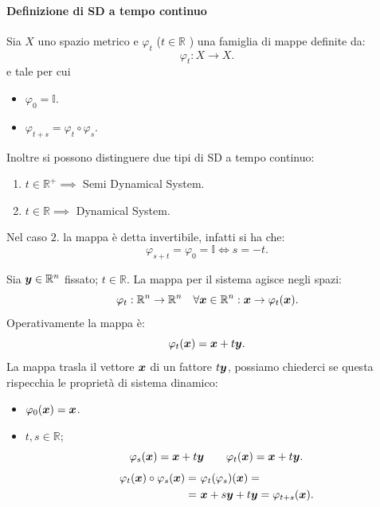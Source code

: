 \paragraph{Definizione di SD a tempo continuo}%
\label{par:Definizione di SD a tempo continuo}
\begin{defn}
    Sia $X$ uno spazio metrico e $\varphi_t$ ($t \in \mathbb{R}$ ) una famiglia di mappe definite da:
    \[
	\varphi_t: X\to X
    .\] 
    e tale per cui
    \begin{itemize}
	\item $\varphi_0 = \mathbb{I}$.
	\item $\varphi_{t+s}=\varphi_t \circ \varphi_s$.
    \end{itemize}
    Inoltre si possono distinguere due tipi di SD a tempo continuo:
    \begin{enumerate}
        \item $t\in \mathbb{R}^+ \implies$ Semi Dynamical System.
        \item $t\in \mathbb{R} \implies$ Dynamical System.
    \end{enumerate}
    Nel caso $2.$ la mappa è detta invertibile, infatti si ha che:
    \[
        \varphi_{s+t} = \varphi_0 = \mathbb{I} \iff s = -t
    .\] 
\end{defn}
\noindent
\begin{exmp}[Traslazione]
    Sia $\boldsymbol{y}\in \mathbb{R}^n$ fissato; $t\in \mathbb{R}$. La mappa per il sistema agisce negli spazi:
    \[
	\varphi_t: \mathbb{R}^n \to \mathbb{R}^n \quad \forall \boldsymbol{x} \in \mathbb{R}^n: \boldsymbol{x}  \to \varphi_t(\boldsymbol{x})
    .\] 
    Operativamente la mappa è:
    \[
	\varphi_t(\boldsymbol{x}) = \boldsymbol{x} + t\boldsymbol{y}
    .\] 
    La mappa trasla il vettore $\boldsymbol{x}$ di un fattore $t\boldsymbol{y}$, possiamo chiederci se questa rispecchia le proprietà di sistema dinamico:
    \begin{itemize}
	\item $\varphi_0(\boldsymbol{x})= \boldsymbol{x}$.
	\item $t, s \in \mathbb{R}$; 
	    \[
		\varphi_s(\boldsymbol{x}) = \boldsymbol{x}  + t\boldsymbol{y}  \qquad \varphi_t(\boldsymbol{x}) = \boldsymbol{x}  + t\boldsymbol{y}
	    .\] 
	    \[\begin{aligned}
		\varphi_t(\vect{x}) \circ \varphi_s(\vect{x}) =& \ \varphi_t(\varphi_s)(\vect{x}) = \\
							       =& \ \vect{x} + s\vect{y} + t\vect{y} = \varphi_{t+s}(\vect{x})
	    .\end{aligned}\]
    \end{itemize}
\end{exmp}
\noindent
